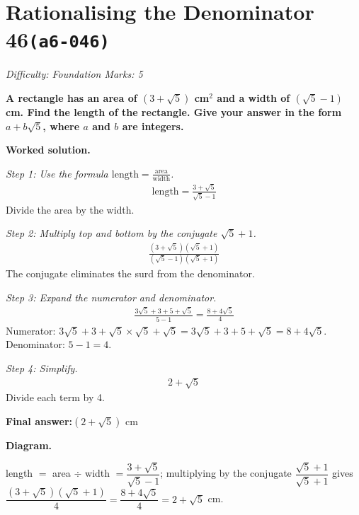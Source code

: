 \documentclass[11pt]{article}
\newcommand{\question}[1]{\par\medskip\noindent\textbf{#1}\par}
\begin{document}
\section*{Rationalising the Denominator 46\quad\small\texttt{(a6-046)}}
\textit{Difficulty: Foundation \quad\textbar\quad Marks: 5}

\question{A rectangle has an area of \( (3 + \sqrt{5}) \) cm\(^2\) and a width of \( (\sqrt{5} - 1) \) cm. Find the length of the rectangle. Give your answer in the form \( a + b\sqrt{5} \), where \( a \) and \( b \) are integers.}

\textbf{Worked solution.}

\textit{Step 1: Use the formula \( \text{length} = \frac{\text{area}}{\text{width}} \).}
\[\begin{gathered}
\text{length} = \frac{3 + \sqrt{5}}{\sqrt{5} - 1}
\end{gathered}\]
Divide the area by the width.

\textit{Step 2: Multiply top and bottom by the conjugate \( \sqrt{5} + 1 \).}
\[\begin{gathered}
\frac{(3 + \sqrt{5})(\sqrt{5} + 1)}{(\sqrt{5} - 1)(\sqrt{5} + 1)}
\end{gathered}\]
The conjugate eliminates the surd from the denominator.

\textit{Step 3: Expand the numerator and denominator.}
\[\begin{gathered}
\frac{3\sqrt{5} + 3 + 5 + \sqrt{5}}{5 - 1} = \frac{8 + 4\sqrt{5}}{4}
\end{gathered}\]
Numerator: \( 3\sqrt{5} + 3 + \sqrt{5} \times \sqrt{5} + \sqrt{5} = 3\sqrt{5} + 3 + 5 + \sqrt{5} = 8 + 4\sqrt{5} \). Denominator: \( 5 - 1 = 4 \).

\textit{Step 4: Simplify.}
\[\begin{gathered}
2 + \sqrt{5}
\end{gathered}\]
Divide each term by 4.

\begin{answerbox}
\textbf{Final answer:}\quad \(\displaystyle (2 + \sqrt{5})\) cm
\end{answerbox}
\textbf{Diagram.}

\begin{center}
\end{center}
\small length $=$ area $\div$ width $=\dfrac{3+\sqrt5}{\sqrt5-1}$; multiplying by the conjugate $\dfrac{\sqrt5+1}{\sqrt5+1}$ gives $\dfrac{(3+\sqrt5)(\sqrt5+1)}{4}=\dfrac{8+4\sqrt5}{4}=2+\sqrt5$ cm.\normalsize
\end{document}
